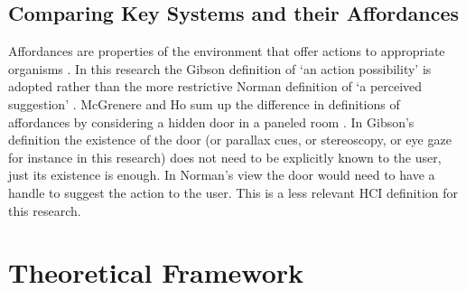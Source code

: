         \subsection{Comparing Key Systems and their Affordances}
Affordances are properties of the environment that offer actions to appropriate organisms \cite{gibson2014ecological}. In this research the Gibson definition of `an action possibility' is adopted rather than the more restrictive Norman definition of `a perceived suggestion' \cite{norman2002psychopathology}. McGrenere and Ho sum up the difference in definitions of affordances by considering a hidden door in a paneled room \cite{McGrenere2000}. In Gibson's definition the existence of the door (or parallax cues, or stereoscopy, or eye gaze for instance in this research) does not need to be explicitly known to the user, just its existence is enough. In Norman's view the door would need to have a handle to suggest the action to the user. This is a less relevant HCI definition for this research.\par

\section{Theoretical Framework}
        
